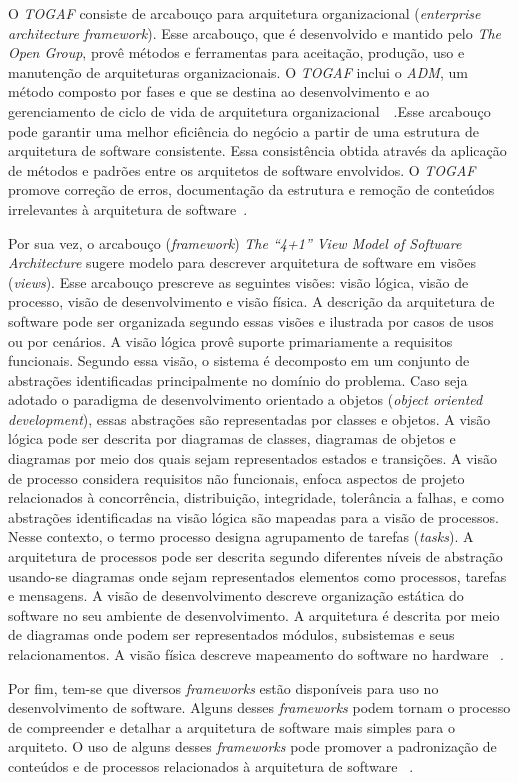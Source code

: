 O \emph{\acrfull{TOGAF}} consiste de arcabouço para arquitetura organizacional (\emph{enterprise architecture framework}). Esse arcabouço, que é desenvolvido e mantido pelo \emph{The Open Group}, provê métodos e ferramentas para aceitação, produção, uso e manutenção de arquiteturas organizacionais. O \emph{\acrfull{TOGAF}} inclui o \emph{\acrfull{ADM}}, um método composto por fases e que se destina ao desenvolvimento e ao gerenciamento de ciclo de vida de arquitetura organizacional~\cite{ISO_42010}~\cite{Togaf}.Esse arcabouço  pode garantir uma melhor eficiência do negócio a partir de uma estrutura de arquitetura de software consistente. Essa consistência obtida através da aplicação de métodos e padrões entre os arquitetos de software envolvidos. O \emph{\acrfull{TOGAF}} promove correção de erros, documentação da estrutura e remoção de conteúdos irrelevantes à arquitetura de software~\cite{Togaf}.

Por sua vez, o arcabouço (\emph{framework}) \emph{The “4+1” View Model of Software Architecture} sugere modelo para descrever arquitetura de software em visões (\emph{views}). 
Esse arcabouço prescreve as seguintes visões: visão lógica, visão de processo, visão de desenvolvimento e visão física. A descrição da arquitetura de software pode ser organizada segundo essas visões e ilustrada por casos de usos ou por cenários.
A visão lógica provê suporte primariamente a requisitos funcionais. Segundo essa visão, o sistema é decomposto em um conjunto de abstrações identificadas principalmente no domínio do problema. Caso seja adotado o paradigma de desenvolvimento orientado a objetos (\emph{object oriented development}), essas abstrações são representadas por classes e objetos. A visão lógica pode ser descrita por diagramas de classes, diagramas de objetos e diagramas por meio dos quais sejam representados estados e transições.
A visão de processo considera requisitos não funcionais, enfoca aspectos de projeto relacionados à concorrência, distribuição, integridade, tolerância a falhas, e como abstrações identificadas na visão lógica são mapeadas para a visão de processos. Nesse contexto, o termo processo designa agrupamento de tarefas (\emph{tasks}).
A arquitetura de processos pode ser descrita segundo diferentes níveis de abstração usando-se diagramas onde sejam representados elementos como processos, tarefas e mensagens.
A visão de desenvolvimento descreve organização estática do software no seu ambiente de desenvolvimento. A arquitetura é descrita por meio de diagramas onde podem ser representados módulos, subsistemas e seus relacionamentos.
A visão física descreve mapeamento do software no hardware ~\cite{4plus1}. 

Por fim, tem-se que diversos \emph{frameworks} estão disponíveis para uso no desenvolvimento de software. Alguns desses \emph{frameworks}  podem tornam o processo de compreender e detalhar a arquitetura de software mais simples para o arquiteto. O uso de alguns desses \emph{frameworks} pode promover a padronização de conteúdos e de processos relacionados à arquitetura de software ~\cite{ISO_42010}.
